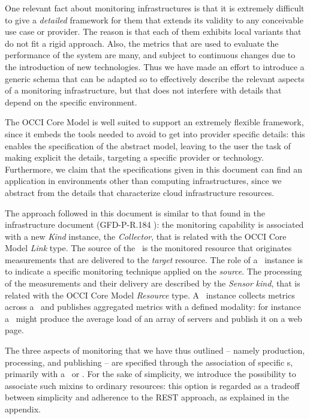 \documentclass[10pt]{article}  %
\begin{document}
One relevant fact about monitoring infrastructures is that it is extremely difficult to give a {\em detailed} framework for them that extends its validity to any conceivable use case or provider. The reason is that each of them exhibits local variants that do not fit a rigid approach. Also, the metrics that are used to evaluate the performance of the system are many, and subject to continuous changes due to the introduction of new technologies. Thus we have made an effort to introduce a generic schema that can be adapted so to effectively describe the relevant aspects of a monitoring infrastructure, but that does not interfere with details that depend on the specific environment.

The OCCI Core Model \cite{occi:core} is well suited to support an extremely flexible framework, since it embeds the tools needed to avoid to get into provider specific details: this enables the specification of the abstract model, leaving to the user the task of making explicit the details, targeting a specific provider or technology. Furthermore, we claim that the specifications given in this document can find an application in environments other than computing infrastructures, since we abstract from the details that characterize cloud infrastructure resources.

The approach followed in this document is similar to that found in the infrastructure document (GFD-P-R.184 \cite{occi:infr}): the monitoring capability is associated with a new {\em Kind} instance, the {\em Collector}, that is related with the OCCI Core Model {\em Link} type. The source of the \coll\ is the monitored resource that originates measurements that are delivered to the {\em target} resource. The role of a \coll\ instance is to indicate a specific monitoring technique applied on the {\em source}. The processing of the measurements and their delivery are described by the {\em Sensor} {\em kind}, that is related with the OCCI Core Model {\em Resource} type. A \sens\ instance collects metrics across a \coll\ and publishes aggregated metrics with a defined modality: for instance a \sens\ might produce the average load of an array of servers and publish it on a web page.

The three aspects of monitoring that we have thus outlined -- namely production, processing, and publishing -- are specified through the association of specific \mi s, primarily with a \sens\ or \coll. For the sake of simplicity, we introduce the possibility to associate such mixins to ordinary resources: this option is regarded as a tradeoff between simplicity and adherence to the REST approach, as explained in the appendix.
\end{document}
